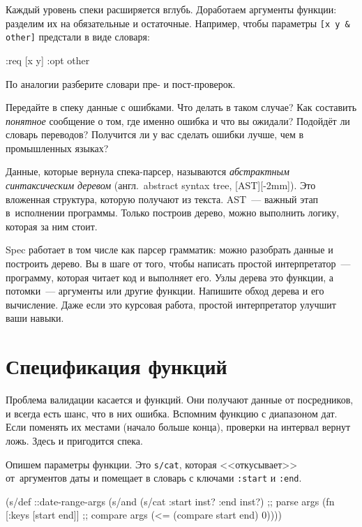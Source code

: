 Каждый уровень спеки расширяется вглубь. Доработаем аргументы функции: разделим
их на обязательные и остаточные. Например, чтобы параметры \verb|[x y & other]|
предстали в виде словаря:

\begin{english}
  \begin{clojure}
{:req [x y] :opt other}
  \end{clojure}
\end{english}

\noindent
По аналогии разберите словари пре- и пост-проверок.

Передайте в спеку данные с ошибками. Что делать в таком случае? Как составить
\emph{понятное} сообщение о том, где именно ошибка и что вы ожидали? Подойдёт ли
словарь переводов? Получится ли у вас сделать ошибки лучше, чем в промышленных
языках?

Данные, которые вернула спека-парсер, называются \emph{абстрактным синтаксическим деревом}
(англ.~abstract syntax tree, [AST][-2mm]).
Это вложенная структура, которую получают из текста. AST~--- важный этап в~исполнении
программы. Только построив дерево, можно выполнить логику, которая за ним стоит.


Spec работает в том числе как парсер грамматик: можно разобрать данные и
построить дерево. Вы в шаге от того, чтобы написать простой интерпретатор~---
программу, которая читает код и выполняет его. Узлы дерева это функции, а
потомки~--- аргументы или другие функции. Напишите обход дерева и его
вычисление. Даже если это курсовая работа, простой интерпретатор улучшит ваши
навыки.

\section{Спецификация функций}


Проблема валидации касается и функций. Они получают данные от посредников, и
всегда есть шанс, что в них ошибка. Вспомним функцию с диапазоном дат. Если
поменять их местами (начало больше конца), проверки на интервал вернут
ложь. Здесь и пригодится спека.

Опишем параметры функции. Это \verb|s/cat|, которая <<откусывает>>
от~аргументов даты и помещает в словарь с ключами \verb|:start| и
\verb|:end|.

\begin{english}
  \begin{clojure}
(s/def ::date-range-args
  (s/and
   (s/cat :start inst? :end inst?) ;; parse args
   (fn [{:keys [start end]}]       ;; compare args
     (<= (compare start end) 0))))
  \end{clojure}
\end{english}


